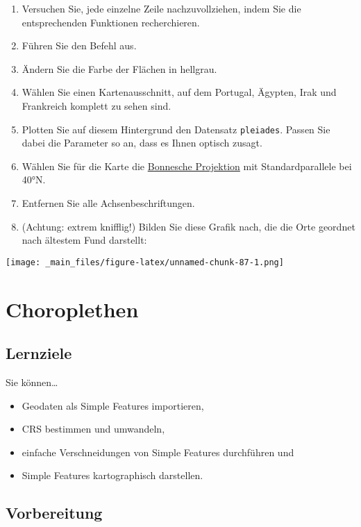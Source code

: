 \documentclass[
  ngerman,
]{article}
\providecommand{\tightlist}{%
  \setlength{\itemsep}{0pt}\setlength{\parskip}{0pt}}
\begin{document}
\begin{enumerate}
\def\labelenumi{\arabic{enumi}.}
\setcounter{enumi}{8}
\item
  Versuchen Sie, jede einzelne Zeile nachzuvollziehen, indem Sie die entsprechenden Funktionen recherchieren.
\item
  Führen Sie den Befehl aus.
\item
  Ändern Sie die Farbe der Flächen in hellgrau.
\item
  Wählen Sie einen Kartenausschnitt, auf dem Portugal, Ägypten, Irak und Frankreich komplett zu sehen sind.
\item
  Plotten Sie auf diesem Hintergrund den Datensatz \texttt{pleiades}. Passen Sie dabei die Parameter so an, dass es Ihnen optisch zusagt.
\item
  Wählen Sie für die Karte die \href{https://de.wikipedia.org/wiki/Bonnesche_Projektion}{Bonnesche Projektion} mit Standardparallele bei 40°N.
\item
  Entfernen Sie alle Achsenbeschriftungen.
\item
  (Achtung: extrem knifflig!) Bilden Sie diese Grafik nach, die die Orte geordnet nach ältestem Fund darstellt:
\end{enumerate}

\texttt{[image: \_main\_files/figure-latex/unnamed-chunk-87-1.png]}

\hypertarget{choroplethen}{%
\section{Choroplethen}\label{choroplethen}}

\hypertarget{lernziele}{%
\subsection{Lernziele}\label{lernziele}}

Sie können\ldots{}

\begin{itemize}
\tightlist
\item
  Geodaten als Simple Features importieren,
\item
  CRS bestimmen und umwandeln,
\item
  einfache Verschneidungen von Simple Features durchführen und
\item
  Simple Features kartographisch darstellen.
\end{itemize}

\hypertarget{vorbereitung-1}{%
\subsection{Vorbereitung}\label{vorbereitung-1}}
\end{document}
